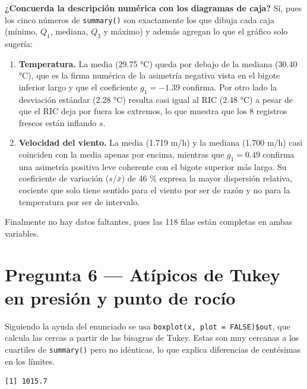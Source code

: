 \documentclass[oneside, openany, fontset=libertinus]{mitthesis}
\newenvironment{Shaded}{\begin{snugshade}}{\end{snugshade}}
\newcommand{\AttributeTok}[1]{\textcolor[rgb]{0.40,0.45,0.13}{#1}}
\newcommand{\ConstantTok}[1]{\textcolor[rgb]{0.56,0.35,0.01}{#1}}
\newcommand{\FunctionTok}[1]{\textcolor[rgb]{0.28,0.35,0.67}{#1}}
\newcommand{\NormalTok}[1]{\textcolor[rgb]{0.00,0.23,0.31}{#1}}
\newcommand{\SpecialCharTok}[1]{\textcolor[rgb]{0.37,0.37,0.37}{#1}}
\providecommand{\tightlist}{\setlength{\itemsep}{0pt}\setlength{\parskip}{0pt}}
\newenvironment{codres}%
  {\par\smallskip\noindent\begin{minipage}[t]{0.57\linewidth}\vspace{0pt}}%
  {\end{minipage}\par\medskip}
\newcommand{\codressep}{\end{minipage}\hfill\begin{minipage}[t]{0.40\linewidth}\vspace{0pt}}
\begin{document}
\textbf{¿Concuerda la descripción numérica con los diagramas de caja?}
Sí, pues los cinco números de \texttt{summary()} son exactamente los que
dibuja cada caja (mínimo, \(Q_1\), mediana, \(Q_3\) y máximo) y además
agregan lo que el gráfico solo sugería:

\begin{enumerate}
\def\labelenumi{\alph{enumi}.}
\tightlist
\item
  \textbf{Temperatura.} La media (29.75 °C) queda por debajo de la
  mediana (30.40 °C), que es la firma numérica de la asimetría negativa
  vista en el bigote inferior largo y que el coeficiente \(g_1 = -1.39\)
  confirma. Por otro lado la desviación estándar (2.28 °C) resulta casi
  igual al RIC (2.48 °C) a pesar de que el RIC deja por fuera los
  extremos, lo que muestra que los 8 registros frescos están inflando
  \(s\).
\item
  \textbf{Velocidad del viento.} La media (1.719 m/h) y la mediana
  (1.700 m/h) casi coinciden con la media apenas por encima, mientras
  que \(g_1 = 0.49\) confirma una asimetría positiva leve coherente con
  el bigote superior más largo. Su coeficiente de variación
  (\(s/\bar{x}\)) de 46 \% expresa la mayor dispersión relativa,
  cociente que solo tiene sentido para el viento por ser de razón y no
  para la temperatura por ser de intervalo.
\end{enumerate}

Finalmente no hay datos faltantes, pues las 118 filas están completas en
ambas variables.

\section{Pregunta 6 --- Atípicos de Tukey en presión y punto de
rocío}\label{p6}

Siguiendo la ayuda del enunciado se usa
\texttt{boxplot(x,\ plot\ =\ FALSE)\$out}, que calcula las cercas a
partir de las bisagras de Tukey. Estas son muy cercanas a los cuartiles
de \texttt{summary()} pero no idénticas, lo que explica diferencias de
centésimas en los límites.

\begin{codres}

\begin{Shaded}
\end{Shaded}

\codressep

\begin{verbatim}
[1] 1015.7
\end{verbatim}

\end{codres}
\end{document}
